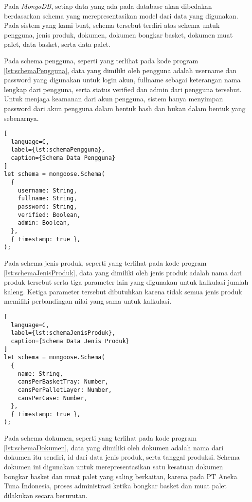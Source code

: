 Pada \emph{MongoDB}, setiap data yang ada pada database akan dibedakan berdasarkan schema yang merepresentasikan model dari data yang digunakan.
Pada sistem yang kami buat, schema tersebut terdiri atas schema untuk pengguna, jenis produk, dokumen, dokumen bongkar basket, dokumen muat palet, data basket, serta data palet.
\vspace{0.5ex}

Pada schema pengguna, seperti yang terlihat pada kode program \ref{lst:schemaPengguna}, data yang dimiliki oleh pengguna adalah username dan password yang digunakan untuk login akun, fullname sebagai keterangan nama lengkap dari pengguna, serta status verified dan admin dari pengguna tersebut.
Untuk menjaga keamanan dari akun pengguna, sistem hanya menyimpan password dari akun pengguna dalam bentuk hash dan bukan dalam bentuk yang sebenarnya.
\vspace{0.5ex}

\begin{lstlisting}[
  language=C,
  label={lst:schemaPengguna},
  caption={Schema Data Pengguna}
]
let schema = mongoose.Schema(
  {
    username: String,
    fullname: String,
    password: String,
    verified: Boolean,
    admin: Boolean,
  },
  { timestamp: true },
);
\end{lstlisting}
\vspace{0.5ex}

Pada schema jenis produk, seperti yang terlihat pada kode program \ref{lst:schemaJenisProduk}, data yang dimiliki oleh jenis produk adalah nama dari produk tersebut serta tiga parameter lain yang digunakan untuk kalkulasi jumlah kaleng.
Ketiga parameter tersebut dibutuhkan karena tidak semua jenis produk memiliki perbandingan nilai yang sama untuk kalkulasi.
\vspace{0.5ex}

\begin{lstlisting}[
  language=C,
  label={lst:schemaJenisProduk},
  caption={Schema Data Jenis Produk}
]
let schema = mongoose.Schema(
  {
    name: String,
    cansPerBasketTray: Number,
    cansPerPalletLayer: Number,
    cansPerCase: Number,
  },
  { timestamp: true },
);
\end{lstlisting}
\vspace{0.5ex}

Pada schema dokumen, seperti yang terlihat pada kode program \ref{lst:schemaDokumen}, data yang dimiliki oleh dokumen adalah nama dari dokumen itu sendiri, id dari data jenis produk, serta tanggal produksi.
Schema dokumen ini digunakan untuk merepresentasikan satu kesatuan dokumen bongkar basket dan muat palet yang saling berkaitan, karena pada PT Aneka Tuna Indonesia, proses administrasi ketika bongkar basket dan muat palet dilakukan secara berurutan.
\vspace{0.5ex}

